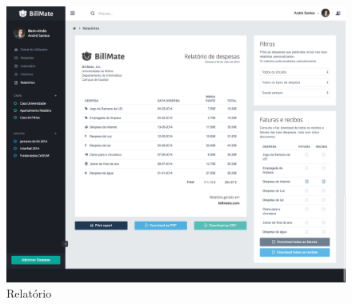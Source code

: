 \begin{referenciaswww}
\begin{figure}[ht]
\includegraphics[width=.5\textwidth]{images/andre/reports}
\caption{Relatório}
\end{figure}

\end{referenciaswww}
